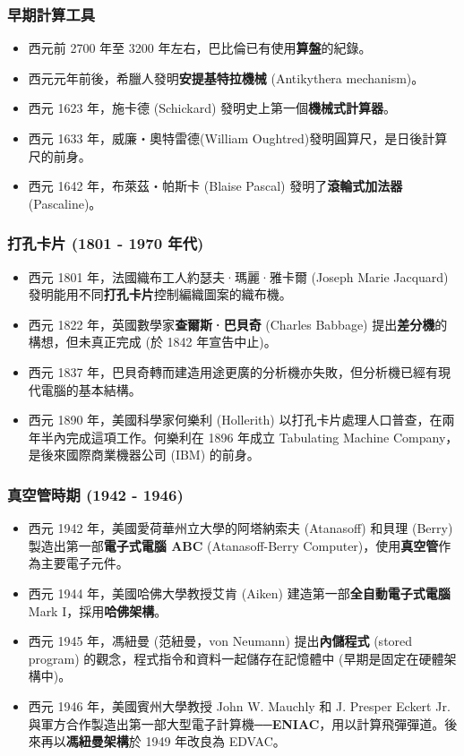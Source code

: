 \documentclass[12pt,a4paper,oneside]{book}
\begin{document}
\begin{CJK}{UTF8}{bkai}
\subsubsection{早期計算工具}
\begin{itemize}
\item 西元前 2700 年至 3200 年左右，巴比倫已有使用\textbf{算盤}的紀錄。
\item 西元元年前後，希臘人發明\textbf{安提基特拉機械} (Antikythera mechanism)。
\item 西元 1623 年，施卡德 (Schickard) 發明史上第一個\textbf{機械式計算器}。
\item 西元 1633 年，威廉‧奧特雷德(William Oughtred)發明圓算尺，是日後計算尺的前身。
\item 西元 1642 年，布萊茲‧帕斯卡 (Blaise Pascal) 發明了\textbf{滾輪式加法器} (Pascaline)。
\end{itemize}

\subsubsection{打孔卡片 (1801 - 1970 年代)}
\begin{itemize}
\item 西元 1801 年，法國織布工人約瑟夫·瑪麗·雅卡爾 (Joseph Marie Jacquard) 發明能用不同\textbf{打孔卡片}控制編織圖案的織布機。
\item 西元 1822 年，英國數學家\textbf{查爾斯·巴貝奇} (Charles Babbage) 提出\textbf{差分機}的構想，但未真正完成 (於 1842 年宣告中止)。
\item 西元 1837 年，巴貝奇轉而建造用途更廣的分析機亦失敗，但分析機已經有現代電腦的基本結構。
\item 西元 1890 年，美國科學家何樂利 (Hollerith) 以打孔卡片處理人口普查，在兩年半內完成這項工作。何樂利在 1896 年成立 Tabulating Machine Company，是後來國際商業機器公司 (IBM) 的前身。
\end{itemize}

\subsubsection{真空管時期 (1942 - 1946)}
\begin{itemize}
\item 西元 1942 年，美國愛荷華州立大學的阿塔納索夫 (Atanasoff) 和貝理 (Berry) 製造出第一部\textbf{電子式電腦 ABC} (Atanasoff-Berry Computer)，使用\textbf{真空管}作為主要電子元件。
\item 西元 1944 年，美國哈佛大學教授艾肯 (Aiken) 建造第一部\textbf{全自動電子式電腦} Mark I，採用\textbf{哈佛架構}。
\item 西元 1945 年，馮紐曼 (范紐曼，von Neumann) 提出\textbf{內儲程式} (stored program) 的觀念，程式指令和資料一起儲存在記憶體中 (早期是固定在硬體架構中)。
\item 西元 1946 年，美國賓州大學教授 John W. Mauchly 和 J. Presper Eckert Jr. 與軍方合作製造出第一部大型電子計算機──\textbf{ENIAC}，用以計算飛彈彈道。後來再以\textbf{馮紐曼架構}於 1949 年改良為 EDVAC。
\end{itemize}


\end{CJK}
\end{document}
